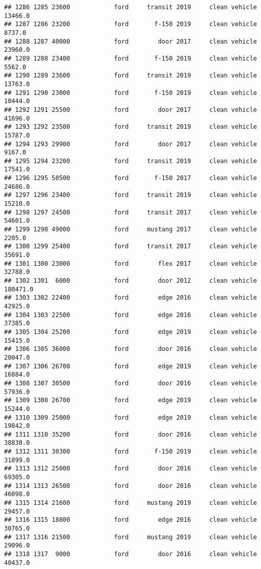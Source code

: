 \documentclass[
]{article}
\begin{document}
\begin{verbatim}
## 1286 1285 23600            ford     transit 2019     clean vehicle   13466.0
## 1287 1286 23200            ford       f-150 2019     clean vehicle    8737.0
## 1288 1287 40000            ford        door 2017     clean vehicle   23960.0
## 1289 1288 23400            ford       f-150 2019     clean vehicle    5562.0
## 1290 1289 23600            ford     transit 2019     clean vehicle   13763.0
## 1291 1290 23000            ford       f-150 2019     clean vehicle   10444.0
## 1292 1291 25500            ford        door 2017     clean vehicle   41696.0
## 1293 1292 23500            ford     transit 2019     clean vehicle   15787.0
## 1294 1293 29900            ford        door 2017     clean vehicle    9167.0
## 1295 1294 23200            ford     transit 2019     clean vehicle   17541.0
## 1296 1295 50500            ford       f-150 2017     clean vehicle   24686.0
## 1297 1296 23400            ford     transit 2019     clean vehicle   15210.0
## 1298 1297 24500            ford     transit 2017     clean vehicle   54601.0
## 1299 1298 49000            ford     mustang 2017     clean vehicle    2205.0
## 1300 1299 25400            ford     transit 2017     clean vehicle   35691.0
## 1301 1300 23000            ford        flex 2017     clean vehicle   32788.0
## 1302 1301  6000            ford        door 2012     clean vehicle  180471.0
## 1303 1302 22400            ford        edge 2016     clean vehicle   42925.0
## 1304 1303 22500            ford        edge 2016     clean vehicle   37385.0
## 1305 1304 25200            ford        edge 2019     clean vehicle   15415.0
## 1306 1305 36000            ford        door 2016     clean vehicle   20047.0
## 1307 1306 26700            ford        edge 2019     clean vehicle   16884.0
## 1308 1307 30500            ford        door 2016     clean vehicle   57936.0
## 1309 1308 26700            ford        edge 2019     clean vehicle   15244.0
## 1310 1309 25000            ford        edge 2019     clean vehicle   19842.0
## 1311 1310 35200            ford        door 2016     clean vehicle   38830.0
## 1312 1311 30300            ford       f-150 2019     clean vehicle   31899.0
## 1313 1312 25000            ford        door 2016     clean vehicle   69305.0
## 1314 1313 26500            ford        door 2016     clean vehicle   46098.0
## 1315 1314 21600            ford     mustang 2019     clean vehicle   29457.0
## 1316 1315 18800            ford        edge 2016     clean vehicle   30765.0
## 1317 1316 21500            ford     mustang 2019     clean vehicle   29096.0
## 1318 1317  9000            ford        door 2016     clean vehicle   40437.0

\end{verbatim}
\end{document}
